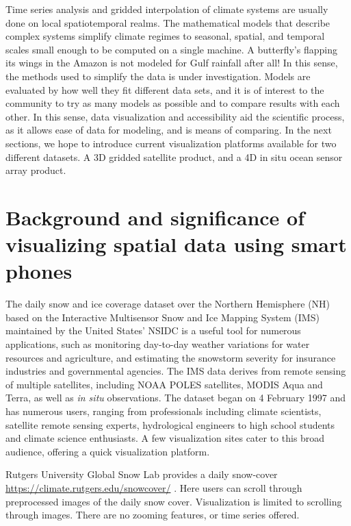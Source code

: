 Time series analysis and gridded interpolation of climate systems are usually done on local spatiotemporal realms. The mathematical models that describe complex systems simplify climate regimes to seasonal, spatial, and temporal scales small enough to be computed on a single machine. A butterfly's flapping its wings in the Amazon is not modeled for Gulf rainfall after all! In this sense, the methods used to simplify the data is under investigation. Models are evaluated by how well they fit different data sets, and it is of interest to the community to try as many models as possible and to compare results with each other. In this sense, data visualization and accessibility aid the scientific process, as it allows ease of data for modeling, and is means of comparing. In the next sections, we hope to introduce current visualization platforms available for two different datasets. A 3D gridded satellite product, and a 4D in situ ocean sensor array product.

\section{Background and significance of visualizing spatial data using smart phones}

The daily snow and ice coverage dataset over the Northern Hemisphere (NH)
based on the Interactive Multisensor Snow and Ice Mapping System (IMS) maintained by the United States' NSIDC \cite{NIC} is a useful tool for numerous applications, such as monitoring day-to-day weather variations for water resources and agriculture, and estimating the snowstorm severity for insurance industries and governmental agencies. 
The IMS data derives from remote sensing of multiple satellites, including NOAA POLES satellites,
MODIS Aqua and Terra, as well as {\it in situ} observations. \cite{fetterer2011ims,ramsay1998interactive}
The dataset began on 4 February 1997 and has numerous users, ranging from professionals including climate scientists, satellite remote sensing experts, hydrological engineers to high school students and climate science enthusiasts. A few visualization sites cater to this broad audience, offering a quick visualization platform. 

Rutgers University Global Snow Lab provides a daily snow-cover \url{https://climate.rutgers.edu/snowcover/} \cite{rutgers_sl}. Here users can scroll through preprocessed images of the daily snow cover. Visualization is limited to scrolling through images. There are no zooming features, or time series offered.

